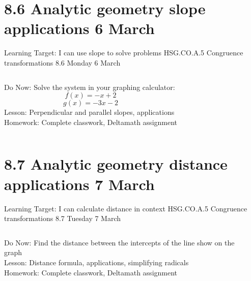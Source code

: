 \section{8.6 Analytic geometry slope applications \hfill 6 March \,}
\begin{frame}{Learning Target: I can use slope to solve problems}
  {HSG.CO.A.5 Congruence transformations \hfill \alert{8.6 Monday 6 March}}
  \begin{columns}
    Do Now: Solve the system in your graphing calculator: 
      $$f(x)=-x+2$$
      $$g(x)=-3x-2$$
    Lesson: Perpendicular and parallel slopes, applications \\
    Homework: Complete classwork, Deltamath assignment
    \begin{flushright}
    \end{flushright}
  \end{columns}
\end{frame}

\section{8.7 Analytic geometry distance applications \hfill 7 March \,}
\begin{frame}{Learning Target: I can calculate distance in context}
  {HSG.CO.A.5 Congruence transformations \hfill \alert{8.7 Tuesday 7 March}}
  \begin{columns}
    Do Now: Find the distance between the intercepts of the line show on the graph \\[0.5cm]
    Lesson: Distance formula, applications, simplifying radicals \\
    Homework: Complete classwork, Deltamath assignment
    \begin{flushright}
    \end{flushright}
  \end{columns}
\end{frame}


